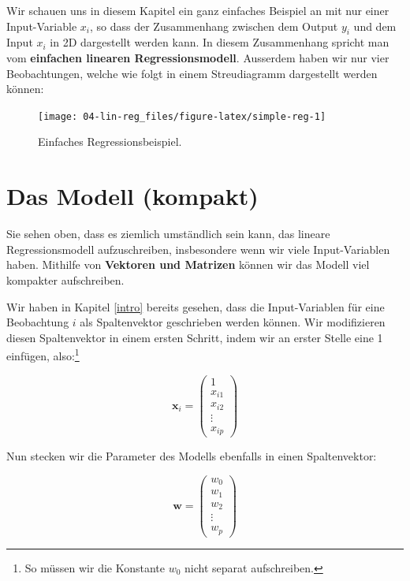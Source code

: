 \documentclass[
]{book}
\begin{document}
Wir schauen uns in diesem Kapitel ein ganz einfaches Beispiel an mit nur einer Input-Variable \(x_i\), so dass der Zusammenhang zwischen dem Output \(y_i\) und dem Input \(x_i\) in 2D dargestellt werden kann. In diesem Zusammenhang spricht man vom \textbf{einfachen linearen Regressionsmodell}. Ausserdem haben wir nur vier Beobachtungen, welche wie folgt in einem Streudiagramm dargestellt werden können:

\begin{figure}

{\centering \texttt{[image: 04-lin-reg\_files/figure-latex/simple-reg-1]} 

}

\caption{Einfaches Regressionsbeispiel.}\label{fig:simple-reg}
\end{figure}

\hypertarget{das-modell-kompakt}{%
\section{Das Modell (kompakt)}\label{das-modell-kompakt}}

Sie sehen oben, dass es ziemlich umständlich sein kann, das lineare Regressionsmodell aufzuschreiben, insbesondere wenn wir viele Input-Variablen haben. Mithilfe von \textbf{Vektoren und Matrizen} können wir das Modell viel kompakter aufschreiben.

Wir haben in Kapitel \ref{intro} bereits gesehen, dass die Input-Variablen für eine Beobachtung \(i\) als Spaltenvektor geschrieben werden können. Wir modifizieren diesen Spaltenvektor in einem ersten Schritt, indem wir an erster Stelle eine 1 einfügen, also:\footnote{So müssen wir die Konstante \(w_0\) nicht separat aufschreiben.}

\[\mathbf{x}_i=\begin{pmatrix} 1\\ x_{i1} \\ x_{i2} \\ \vdots \\ x_{ip} \end{pmatrix}\]

Nun stecken wir die Parameter des Modells ebenfalls in einen Spaltenvektor:

\[\mathbf{w}=\begin{pmatrix} w_0 \\ w_1 \\ w_2 \\ \vdots \\ w_p \end{pmatrix}\]
\end{document}
